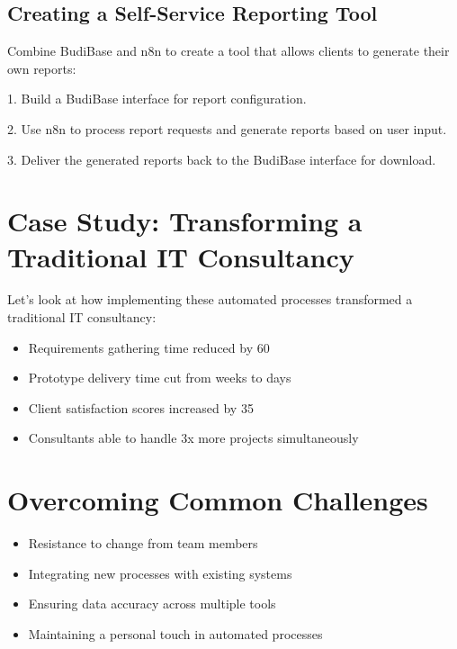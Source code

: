 \subsection{Creating a Self-Service Reporting Tool}

Combine BudiBase and n8n to create a tool that allows clients to generate their own reports:

1. Build a BudiBase interface for report configuration.

2. Use n8n to process report requests and generate reports based on user input.

3. Deliver the generated reports back to the BudiBase interface for download.


\section{Case Study: Transforming a Traditional IT Consultancy}

Let's look at how implementing these automated processes transformed a traditional IT consultancy:

\begin{itemize}
    \item Requirements gathering time reduced by 60%
    \item Prototype delivery time cut from weeks to days
    \item Client satisfaction scores increased by 35%
    \item Consultants able to handle 3x more projects simultaneously
\end{itemize}


\section{Overcoming Common Challenges}

\begin{itemize}
    \item Resistance to change from team members
    \item Integrating new processes with existing systems
    \item Ensuring data accuracy across multiple tools
    \item Maintaining a personal touch in automated processes
\end{itemize}

